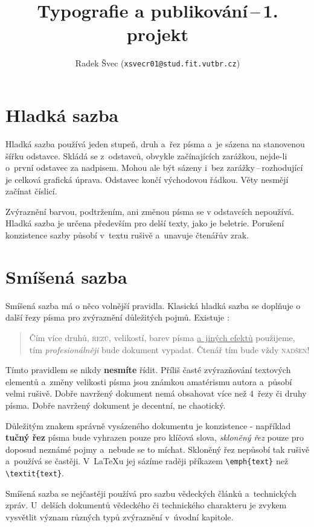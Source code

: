 \documentclass[czech,a4paper,10pt,twocolumn]{article}
\title{Typografie a publikování\,--\,1. projekt}
\author{Radek Švec (\texttt{xsvecr01@stud.fit.vutbr.cz})}
\date{}
\begin{document}
\maketitle
\section{Hladká sazba}

Hladká sazba používá jeden stupeň, druh a~řez písma a~je sázena na stanovenou šířku odstavce. Skládá se z~odstavců, obvykle začínajících zarážkou, nejde-li o~první odstavec za nadpisem. Mohou ale být sázeny i~bez zarážky\,--\,rozhodující je celková grafická úprava. Odstavec končí východovou řádkou. Věty nesmějí začínat číslicí.

Zvýraznění barvou, podtržením, ani změnou písma se v odstavcích nepoužívá. Hladká sazba je určena především pro delší texty, jako je beletrie. Porušení konzistence sazby působí v~textu rušivě a~unavuje čtenářův zrak.

\section{Smíšená sazba}

Smíšená sazba má o něco volnější pravidla. Klasická hladká sazba se doplňuje o další řezy písma pro zvýraznění důležitých pojmů. Existuje :

\begin{quote}
\quad \textsf{\Large Čím více druhů}, \textsc{řezů}, {\tiny velikostí}, barev písma \underline{a~jiných efektů} použijeme, tím \emph{\large profesionálněji} bude dokument vypadat. Čtenář tím bude vždy \textsc{nadšen}!
\end{quote}

{\footnotesize Tímto} pravidlem se nikdy \textbf{nesmíte} řídit. Příliš časté {\large zvýrazňování} textových elementů a~změny velikosti {\huge písma} jsou známkou amatérismu autora a~působí {\Huge velmi} rušivě. Dobře navržený dokument nemá obsahovat více než
4~řezy či druhy písma. Dobře navržený dokument je decentní, ne chaotický.

Důležitým znakem správně vysázeného dokumentu je konzistence - například \textbf{tučný řez} písma bude vyhrazen pouze pro klíčová slova, \emph{skloněný řez} pouze pro doposud neznámé pojmy a~nebude se to míchat. Skloněný řez nepůsobí tak rušivě a~používá se častěji. V~{\LaTeX}u jej sázíme raději příkazem \verb|\emph{text}| než \verb|\textit{text}|.

Smíšená sazba se nejčastěji používá pro sazbu vědeckých článků a~technických zpráv. U~delších dokumentů vědeckého či technického charakteru je zvykem vysvětlit význam různých typů zvýraznění v~úvodní kapitole.
\end{document}
